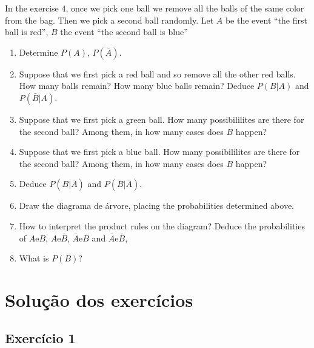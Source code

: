 In the exercise $4$, once we pick one ball we remove all the balls of the
same color from the bag. Then we pick a second ball randomly.
Let $A$ be the event ``the first ball is red'',
$B$ the event ``the second ball is blue''

\begin{enumerate}
\item Determine $P(A)$, $P(\bar{A})$.
\item Suppose that we first
  pick a red ball and so remove all the other red balls.
  How many balls remain? How many blue balls remain? 
  Deduce $P(B|A)$ and $P(\bar{B}|A)$.
\item Suppose that we first pick a green ball.
  How many possibililites are there for the second ball? Among them,
  in how many cases does $B$ happen?
\item Suppose that we first pick a blue ball.
  How many possibililites are there for the second ball? Among them,
  in how many cases does $B$ happen?
\item Deduce $P(B|\bar{A})$ and $P(\bar{B}|\bar{A})$.
\item Draw the diagrama de árvore, placing the probabilities determined above.
\item How to interpret the product rules on the diagram?
  Deduce the probabilities of
   $A \text{e} B$, $A \text{e} \bar{B}$, $\bar{A} \text{e} B$ and
  $\bar{A} \text{e} \bar{B}$,
\item What is $P(B)$?
\end{enumerate}

\section{Solução dos exercícios}

\subsection*{Exercício 1}

